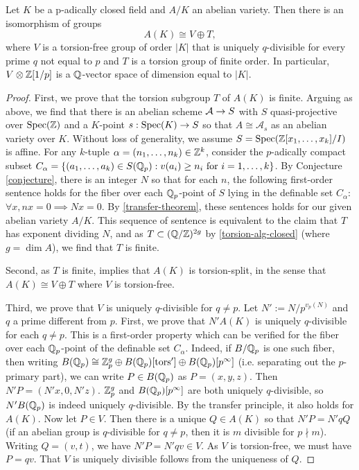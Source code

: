 \begin{theorem} Let $K$ be a p-adically closed field and $A/K$ an abelian variety. Then there is an isomorphism of groups $$A(K)\cong V\oplus T,$$ where $V$ is a torsion-free group of order $|K|$ that is uniquely $q$-divisible for every prime $q$ not equal to $p$ and $T$ is a torsion group of finite order. In particular, $V\otimes \mathbb{Z}[1/p]$ is a $\mathbb{Q}$-vector space of dimension equal to $|K|$.
\begin{proof}
First, we prove that the torsion subgroup $T$ of $A(K)$ is finite. Arguing as above, we find that there is an abelian scheme $\mathcal{A}\rightarrow S$ with $S$ quasi-projective over $\operatorname{Spec}(\mathbb{Z})$ and a $K$-point $s:\operatorname{Spec}(K)\rightarrow S$ so that $A\cong \mathcal{A}_s$ as an abelian variety over $K$. Without loss of generality, we assume $S=\operatorname{Spec}(\mathbb{Z}[x_1,\dots, x_k]/I)$ is affine. For any $k$-tuple $\alpha = (n_1,\dots, n_k)\in\mathbb{Z}^k$, consider the $p$-adically compact subset $C_{\alpha}= \{(a_1,\dots, a_k)\in S(\mathbb{Q}_p): v(a_i)\geq n_i\text{ for } i=1,\dots, k\}$. By Conjecture \ref{conjecture}, there is an integer $N$ so that for each $n$, the following first-order sentence holds for the fiber over each $\mathbb{Q}_p$-point of $S$ lying in the definable set $C_{\alpha}$: $\forall x, nx=0\implies Nx=0$. By \ref{transfer-theorem}, these sentences holds for our given abelian variety $A/K$. This sequence of sentence is equivalent to the claim that $T$ has exponent dividing $N$, and as $T\subset (\mathbb{Q}/\mathbb{Z})^{2g}$ by \ref{torsion-alg-closed} (where $g=\dim A$), we find that $T$ is finite.

Second, as $T$ is finite, \cite{baer} implies that $A(K)$ is torsion-split, in the sense that $A(K)\cong V\oplus T$ where $V$ is torsion-free.

Third, we prove that $V$ is uniquely $q$-divisible for $q\neq p$. 
Let $N':= N/p^{v_p(N)}$ and $q$ a prime different from $p$. First, we prove that $N'A(K)$ is uniquely $q$-divisible for each $q\neq p$. This is a first-order property which can be verified for the fiber over each $\mathbb{Q}_p$-point of the definable set $C_{\alpha}$. Indeed, if $B/\mathbb{Q}_p$ is one such fiber, then writing $B(\mathbb{Q}_p)\cong \mathbb{Z}_p^g \oplus B(\mathbb{Q}_p)[\operatorname{tors} '] \oplus B(\mathbb{Q}_p)[p^{\infty}]$ (i.e. separating out the $p$-primary part), we can write $P\in B(\mathbb{Q}_p)$ as $P=(x,y,z)$. Then $N'P=(N'x,0,N'z)$. $\mathbb{Z}_p^g$ and $B(\mathbb{Q}_p)[p^{\infty}]$ are both uniquely $q$-divisible, so $N'B(\mathbb{Q}_p)$ is indeed uniquely $q$-divisible. By the transfer principle, it also holds for $A(K)$. Now let $P\in V$. Then there is a unique $Q\in A(K)$ so that $N'P=N'qQ$ (if an abelian group is $q$-divisible for $q\neq p$, then it is $m$ divisible for $p\nmid m$). Writing $Q=(v,t)$, we have $N'P=N'qv\in V$. As $V$ is torsion-free, we must have $P=qv$. That $V$ is uniquely divisible follows from the uniqueness of $Q$. 


\end{proof}
\end{theorem}
